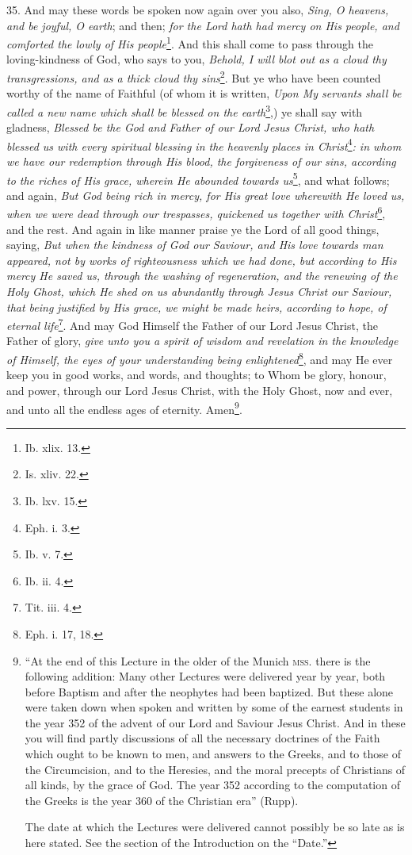 35. And may these words be spoken now again over you also, \emph{Sing, O heavens, and be joyful, O earth}; and then; \emph{for the Lord hath had mercy on His people, and comforted the lowly of His people}\footnote{Ib. xlix. 13.}. And this shall come to pass through the loving-kindness of God, who says to you, \emph{Behold, I will blot out as a cloud thy transgressions, and as a thick cloud thy sins}\footnote{Is. xliv. 22.}. But ye who have been counted worthy of the name of Faithful (of whom it is written, \emph{Upon My servants shall be called a new name which shall be blessed on the earth}\footnote{Ib. lxv. 15.},) ye shall say with gladness, \emph{Blessed be the God and Father of our Lord Jesus Christ, who hath blessed us with every spiritual blessing in the heavenly places in Christ}\footnote{Eph. i. 3.}\emph{: in whom we have our redemption through His blood, the forgiveness of our sins, according to the riches of His grace, wherein He abounded towards us}\footnote{Ib. v. 7.}, and what follows; and again, \emph{But God being rich in mercy, for His great love wherewith He loved us, when we were dead through our trespasses, quickened us together with Christ}\footnote{Ib. ii. 4.}, and the rest. And again in like manner praise ye the Lord of all good things, saying, \emph{But when the kindness of God our Saviour, and His love towards man appeared, not by works of righteousness which we had done, but according to His mercy He saved us, through the washing of regeneration, and the renewing of the Holy Ghost, which He shed on us abundantly through Jesus Christ our Saviour, that being} \emph{justified by His grace, we might be made heirs, according to hope, of eternal life}\footnote{Tit. iii. 4.}. And may God Himself the Father of our Lord Jesus Christ, the Father of glory, \emph{give unto you a spirit of wisdom and revelation in the knowledge of Himself, the eyes of your understanding being enlightened}\footnote{Eph. i. 17, 18.}, and may He ever keep you in good works, and words, and thoughts; to Whom be glory, honour, and power, through our Lord Jesus Christ, with the Holy Ghost, now and ever, and unto all the endless ages of eternity. Amen\footnote{“At the end of this Lecture in the older of the Munich \textsc{mss}. there is the following addition: Many other Lectures were delivered year by year, both before Baptism and after the neophytes had been baptized. But these alone were taken down when spoken and written by some of the earnest students in the year 352 of the advent of our Lord and Saviour Jesus Christ. And in these you will find partly discussions of all the necessary doctrines of the Faith which ought to be known to men, and answers to the Greeks, and to those of the Circumcision, and to the Heresies, and the moral precepts of Christians of all kinds, by the grace of God. The year 352 according to the computation of the Greeks is the year 360 of the Christian era” (Rupp). \par The date at which the Lectures were delivered cannot possibly be so late as is here stated. See the section of the Introduction on the “Date.”}.

